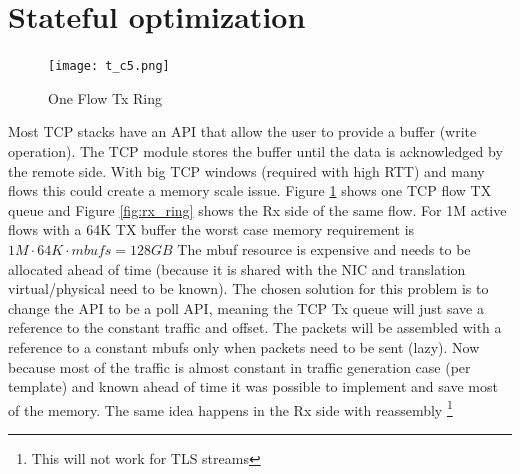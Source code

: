 \documentclass[letterpaper]{article}
\begin{document}

\section{Stateful optimization}

\begin{figure}[h]
\texttt{[image: t\_c5.png]}
\caption{One Flow Tx Ring}
\label{fig:tx_ring}
\end{figure}

Most TCP stacks have an API that allow the user to provide a buffer (write operation). 
The TCP module stores the buffer until the data is acknowledged by the remote side. 
With big TCP windows (required with high RTT) and many flows this could create a memory scale issue. 
Figure \ref{fig:tx_ring} shows one TCP flow TX queue and Figure \ref{fig:rx_ring} shows the Rx side of the same flow. For 1M active flows with a 64K TX buffer 
the worst case memory requirement is $1M \cdot 64K \cdot  mbufs  = 128GB$
The mbuf resource is expensive and needs to be allocated ahead of time (because it is shared with the NIC and translation virtual/physical need to be known). 
The chosen solution for this problem is to change the API to be a poll API, 
meaning the TCP Tx queue will just save a reference to the constant traffic and offset. The packets will be assembled with a reference to a constant mbufs only when packets need to be sent (lazy). 
Now because most of the traffic is almost constant in traffic generation case (per template) and known ahead of time it was possible to implement and save most of the memory.
The same idea happens in the Rx side with reassembly \footnote{This will not work for TLS streams}
\end{document}
